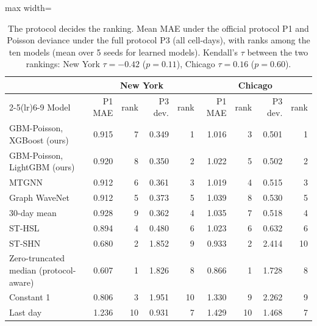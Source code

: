 \begin{table}[!htbp]\centering\small
\setlength{\tabcolsep}{4pt}\caption{The protocol decides the ranking. Mean MAE under the official protocol P1 and Poisson deviance under the full protocol P3 (all cell-days), with ranks among the ten models (mean over 5 seeds for learned models). Kendall's $\tau$ between the two rankings: New York $\tau=-0.42$ ($p=0.11$), Chicago $\tau=0.16$ ($p=0.60$).}\label{tab:rankings}
\begin{adjustbox}{max width=\linewidth}\begin{tabular}{lrrrrrrrr}\toprule
 & \multicolumn{4}{c}{New York} & \multicolumn{4}{c}{Chicago}\\\cmidrule(lr){2-5}\cmidrule(lr){6-9}
Model & P1 MAE & rank & P3 dev. & rank & P1 MAE & rank & P3 dev. & rank\\\midrule
GBM-Poisson, XGBoost (ours) & 0.915 & 7 & 0.349 & 1 & 1.016 & 3 & 0.501 & 1 \\
GBM-Poisson, LightGBM (ours) & 0.920 & 8 & 0.350 & 2 & 1.022 & 5 & 0.502 & 2 \\
MTGNN & 0.912 & 6 & 0.361 & 3 & 1.019 & 4 & 0.515 & 3 \\
Graph WaveNet & 0.912 & 5 & 0.373 & 5 & 1.039 & 8 & 0.530 & 5 \\
30-day mean & 0.928 & 9 & 0.362 & 4 & 1.035 & 7 & 0.518 & 4 \\
ST-HSL & 0.894 & 4 & 0.480 & 6 & 1.023 & 6 & 0.632 & 6 \\
ST-SHN & 0.680 & 2 & 1.852 & 9 & 0.933 & 2 & 2.414 & 10 \\
Zero-truncated median (protocol-aware) & 0.607 & 1 & 1.826 & 8 & 0.866 & 1 & 1.728 & 8 \\
Constant 1 & 0.806 & 3 & 1.951 & 10 & 1.330 & 9 & 2.262 & 9 \\
Last day & 1.236 & 10 & 0.931 & 7 & 1.429 & 10 & 1.468 & 7 \\
\bottomrule\end{tabular}\end{adjustbox}\end{table}
